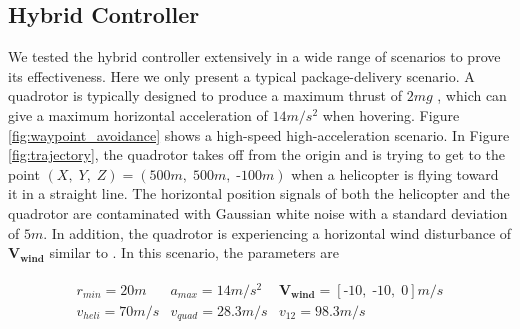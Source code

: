\documentclass[journal,11pt,onecolumn,draftclsnofoot,]{IEEEtran}
\begin{document}
\subsection{Hybrid Controller}

We tested the hybrid controller extensively in a wide range of scenarios to prove its effectiveness. Here we only present a typical package-delivery scenario. A quadrotor is typically designed to produce a maximum thrust of $2mg$ \cite{quad_design}, which can give a maximum horizontal acceleration of $14m/s^2$ when hovering. Figure \ref{fig:waypoint_avoidance} shows a high-speed high-acceleration scenario. In Figure \ref{fig:trajectory}, the quadrotor takes off from the origin and is trying to get to the point $(X,\;Y, \; Z)=(500m, \; 500m, \; \text{-}100m)$ when a helicopter is flying toward it in a straight line. The horizontal position signals of both the helicopter and the quadrotor are contaminated with Gaussian white noise with a standard deviation of $5m$. In addition, the quadrotor is experiencing a horizontal wind disturbance of $\boldsymbol{V_{wind}}$ similar to \cite{madani2006backstepping_2}. In this scenario, the parameters are

\begin{equation*}
\label{eq:hybrid_param}
\begin{split}
\begin{matrix}
r_{min} = 20 m &
a_{max} = 14 m/s^2 &
\boldsymbol{V_{wind}}=[\text{-}10, \; \text{-}10,\; 0]m/s\\
v_{heli} = 70 m/s &
v_{quad} = 28.3 m/s &
v_{12} = 98.3 m/s \\
\end{matrix}
\end{split}
\end{equation*}
\end{document}
